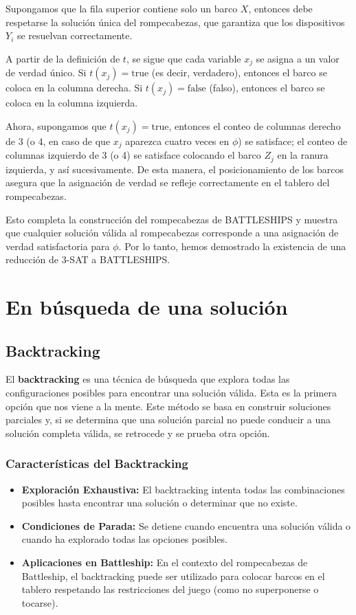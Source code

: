 \documentclass{article}
\begin{document}
Supongamos que la fila superior contiene solo un barco $X$, entonces debe respetarse la solución única del rompecabezas, que garantiza que los dispositivos $Y_i$ se resuelvan correctamente.

A partir de la definición de $t$, se sigue que cada variable $x_j$ se asigna a un valor de verdad único. Si $t(x_j) = \text{true}$ (es decir, verdadero), entonces el barco se coloca en la columna derecha. Si $t(x_j) = \text{false}$ (falso), entonces el barco se coloca en la columna izquierda.

Ahora, supongamos que $t(x_j) = \text{true}$, entonces el conteo de columnas derecho de 3 (o 4, en caso de que $x_j$ aparezca cuatro veces en $\phi$) se satisface; el conteo de columnas izquierdo de 3 (o 4) se satisface colocando el barco $Z_j$ en la ranura izquierda, y así sucesivamente. De esta manera, el posicionamiento de los barcos asegura que la asignación de verdad se refleje correctamente en el tablero del rompecabezas.

Esto completa la construcción del rompecabezas de BATTLESHIPS y muestra que cualquier solución válida al rompecabezas corresponde a una asignación de verdad satisfactoria para $\phi$. Por lo tanto, hemos demostrado la existencia de una reducción  de 3-SAT a BATTLESHIPS.
\section{En búsqueda de una solución}

\subsection{Backtracking}

El \textbf{backtracking} es una técnica de búsqueda que explora todas las configuraciones posibles para encontrar una solución válida. Esta es la primera opción que nos viene a la mente. Este método se basa en construir soluciones parciales y, si se determina que una solución parcial no puede conducir a una solución completa válida, se retrocede y se prueba otra opción.

\subsubsection{Características del Backtracking}
\begin{itemize}
    \item \textbf{Exploración Exhaustiva:} El backtracking intenta todas las combinaciones posibles hasta encontrar una solución o determinar que no existe.
    \item \textbf{Condiciones de Parada:} Se detiene cuando encuentra una solución válida o cuando ha explorado todas las opciones posibles.
    \item \textbf{Aplicaciones en Battleship:} En el contexto del rompecabezas de Battleship, el backtracking puede ser utilizado para colocar barcos en el tablero respetando las restricciones del juego (como no superponerse o tocarse).
\end{itemize}
\end{document}
